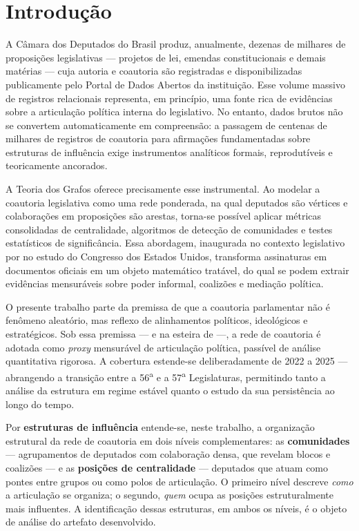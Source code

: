 \documentclass[
      12pt,
      a4paper,
      openright,
      oneside,
      chapter=TITLE,
      section=TITLE,
      english,
      french,
      spanish,
      brazilian
    ]{abntex2}
\begin{document}
    \chapter{Introdução}
    \label{cap:introducao}
    
    A Câmara dos Deputados do Brasil produz, anualmente, dezenas de milhares de proposições legislativas --- projetos de lei, emendas constitucionais e demais matérias --- cuja autoria e coautoria são registradas e disponibilizadas publicamente pelo Portal de Dados Abertos da instituição. Esse volume massivo de registros relacionais representa, em princípio, uma fonte rica de evidências sobre a articulação política interna do legislativo. No entanto, dados brutos não se convertem automaticamente em compreensão: a passagem de centenas de milhares de registros de coautoria para afirmações fundamentadas sobre estruturas de influência exige instrumentos analíticos formais, reprodutíveis e teoricamente ancorados.
    
    A Teoria dos Grafos oferece precisamente esse instrumental. Ao modelar a coautoria legislativa como uma rede ponderada, na qual deputados são vértices e colaborações em proposições são arestas, torna-se possível aplicar métricas consolidadas de centralidade, algoritmos de detecção de comunidades e testes estatísticos de significância. Essa abordagem, inaugurada no contexto legislativo por  no estudo do Congresso dos Estados Unidos, transforma assinaturas em documentos oficiais em um objeto matemático tratável, do qual se podem extrair evidências mensuráveis sobre poder informal, coalizões e mediação política.
    
    O presente trabalho parte da premissa de que a coautoria parlamentar não é fenômeno aleatório, mas reflexo de alinhamentos políticos, ideológicos e estratégicos. Sob essa premissa --- e na esteira de  ---, a rede de coautoria é adotada como \textit{proxy} mensurável de articulação política, passível de análise quantitativa rigorosa. A cobertura estende-se deliberadamente de 2022 a 2025 --- abrangendo a transição entre a 56\textsuperscript{a} e a 57\textsuperscript{a} Legislaturas, permitindo tanto a análise da estrutura em regime estável quanto o estudo da sua persistência ao longo do tempo.
    
    Por \textbf{estruturas de influência} entende-se, neste trabalho, a organização estrutural da rede de coautoria em dois níveis complementares: as \textbf{comunidades} --- agrupamentos de deputados com colaboração densa, que revelam blocos e coalizões --- e as \textbf{posições de centralidade} --- deputados que atuam como pontes entre grupos ou como polos de articulação. O primeiro nível descreve \textit{como} a articulação se organiza; o segundo, \textit{quem} ocupa as posições estruturalmente mais influentes. A identificação dessas estruturas, em ambos os níveis, é o objeto de análise do artefato desenvolvido.
    
\end{document}
